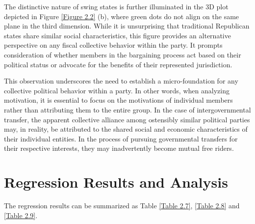 \documentclass[man]{apa7}
\begin{document}
The distinctive nature of swing states is further illuminated in the 3D plot depicted in Figure \ref{Figure 2.2} (b), where green dots do not align on the same plane in the third dimension. While it is unsurprising that traditional Republican states share similar social characteristics, this figure provides an alternative perspective on any fiscal collective behavior within the party. It prompts consideration of whether members in the bargaining process act based on their political status or advocate for the benefits of their represented jurisdiction.

This observation underscores the need to establish a micro-foundation for any collective political behavior within a party. In other words, when analyzing motivation, it is essential to focus on the motivations of individual members rather than attributing them to the entire group. In the case of intergovernmental transfer, the apparent collective alliance among ostensibly similar political parties may, in reality, be attributed to the shared social and economic characteristics of their individual entities. In the process of pursuing governmental transfers for their respective interests, they may inadvertently become mutual free riders.




\section{Regression Results and Analysis}
The regression results can be summarized as Table \ref{Table 2.7}, \ref{Table 2.8} and \ref{Table 2.9}.
\end{document}
